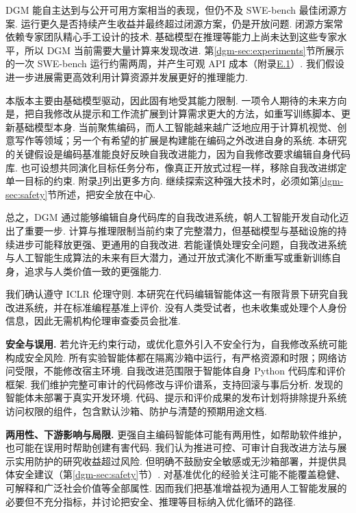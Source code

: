 DGM 能自主达到与公开可用方案相当的表现，但仍不及 SWE-bench 最佳闭源方案. 运行更久是否持续产生收益并最终超过闭源方案，仍是开放问题. 闭源方案常依赖专家团队精心手工设计的技术. 基础模型在推理等能力上尚未达到这些专家水平，所以 DGM 当前需要大量计算来发现改进. 第\ref{dgm-sec:experiments}节所展示的一次 SWE-bench 运行约需两周，并产生可观 API 成本（附录\hyperref[dgm-app:cost-estimate]{E.1}）. 我们假设进一步进展需更高效利用计算资源并发展更好的推理能力.

本版本主要由基础模型驱动，因此固有地受其能力限制. 一项令人期待的未来方向是，把自我修改从提示和工作流扩展到计算需求更大的方法，如重写训练脚本、更新基础模型本身. 当前聚焦编码，而人工智能越来越广泛地应用于计算机视觉、创意写作等领域；另一个有希望的扩展是构建能在编码之外改进自身的系统. 本研究的关键假设是编码基准能良好反映自我改进能力，因为自我修改要求编辑自身代码库. 也可设想共同演化目标任务分布\cite{dgm-faldor2025omni,dgm-wang2023robogen}，像真正开放式过程一样，移除自我改进绑定单一目标的约束. 附录\hyperref[dgm-app:future-work]{J}列出更多方向. 继续探索这种强大技术时，必须如第\ref{dgm-sec:safety}节所述，把安全放在中心.

总之，DGM 通过能够编辑自身代码库的自我改进系统，朝人工智能开发自动化迈出了重要一步. 计算与推理限制当前约束了完整潜力，但基础模型与基础设施的持续进步可能释放更强、更通用的自我改进. 若能谨慎处理安全问题，自我改进系统与人工智能生成算法\cite{dgm-clune2019ai}的未来有巨大潜力，通过开放式演化不断重写或重新训练自身，追求与人类价值一致的更强能力.

\label{dgm-ethics}
我们确认遵守 ICLR 伦理守则. 本研究在代码编辑智能体这一有限背景下研究自我改进系统，并在标准编程基准上评价. 没有人类受试者，也未收集或处理个人身份信息，因此无需机构伦理审查委员会批准.

\textbf{安全与误用.} 若允许无约束行动，或优化意外引入不安全行为，自我修改系统可能构成安全风险. 所有实验智能体都在隔离沙箱中运行，有严格资源和时限；网络访问受限，不能修改宿主环境. 自我改进范围限于智能体自身 Python 代码库和评价框架. 我们维护完整可审计的代码修改与评价谱系，支持回滚与事后分析. 发现的智能体未部署于真实开发环境. 代码、提示和评价成果的发布计划将排除提升系统访问权限的组件，包含默认沙箱、防护与清楚的预期用途文档.

\textbf{两用性、下游影响与局限.} 更强自主编码智能体可能有两用性，如帮助软件维护，也可能在误用时帮助创建有害代码. 我们认为推进可控、可审计自我改进方法与展示实用防护的研究收益超过风险. 但明确不鼓励安全敏感或无沙箱部署，并提供具体安全建议（第\ref{dgm-sec:safety}节）. 对基准优化的经验关注可能不能覆盖稳健、可解释和广泛社会价值等全部属性. 因而我们把基准增益视为通用人工智能发展的必要但不充分指标，并讨论把安全、推理等目标纳入优化循环的路径.

